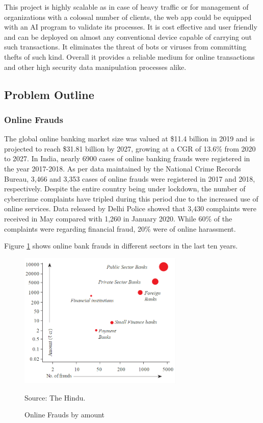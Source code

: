 \documentclass[12pt, oneside, a4paper]{article}
\begin{document}
This project is highly scalable as in case of heavy traffic or for management of organizations with a colossal number of clients, the web app could be equipped with an AI program to validate its processes. It is cost effective and user friendly and can be deployed on almost any conventional device capable of carrying out such transactions. It eliminates the threat of bots or viruses from committing thefts of such kind. Overall it provides a reliable medium for online transactions and other high security data manipulation processes alike.

\pagebreak
\subsection{Problem Outline}
\vspace{0.5cm}
\subsubsection{Online Frauds}
The global online banking market size was valued at \$11.4 billion in 2019 and is projected to reach \$31.81 billion by 2027, growing at a CGR of 13.6\% from 2020 to 2027. In India, nearly 6900 cases of online banking frauds were registered in the year 2017-2018. As per data maintained by the National Crime Records Bureau, 3,466 and 3,353 cases of online frauds were registered in 2017 and 2018, respectively. Despite the entire country being under lockdown, the number of cybercrime complaints have tripled during this period due to the increased use of online services. Data released by Delhi Police showed that 3,430 complaints were received in May compared with 1,260 in January 2020. While 60\% of the complaints were regarding financial fraud, 20\% were of online harassment.

Figure \ref{fig:Figure 1} shows online bank frauds in different sectors in the last ten years.

\begin{figure}[H]
\begin{center}
\includegraphics[width=0.7\textwidth]{Figure1.png}\\
\caption{Online Frauds by amount}{Source: The Hindu.}
\label{fig:Figure 1}
\end{center}
\end{figure}
\end{document}
